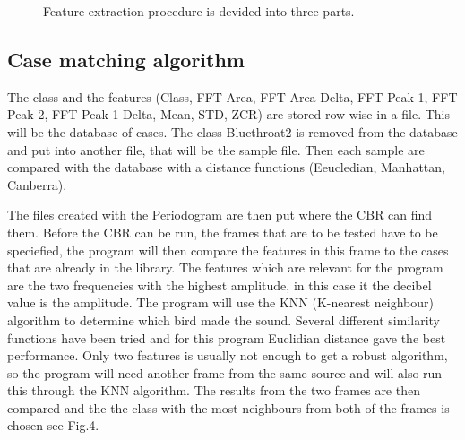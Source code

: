\begin{figure}[htp]




    \caption{Feature extraction procedure is devided into three parts.}
    \label{fig:featureExtraction}
\end{figure}



\subsection{Case matching algorithm}
The class and the features
(Class, FFT Area, FFT Area Delta, FFT Peak 1, FFT Peak 2, FFT Peak 1 Delta, Mean, STD, ZCR)
are stored row-wise in a file. This will be the database of cases.
The class Bluethroat2 is removed from the database and put into another file, that will be the sample file.
Then each sample are compared with the database with a distance functions (Eeucledian, Manhattan, Canberra).

The files created with the Periodogram are then put where the CBR can find them.
Before the CBR can be run, the frames that are to be tested have to be
speciefied, the program will then compare the features in this frame to the
cases that are already in the library. The features which are relevant for
the program are the two frequencies with the highest amplitude, in this case
it the decibel value is the amplitude. The program will use the KNN
(K-nearest neighbour) algorithm to determine which bird made the sound.
Several different similarity functions have been tried and for this program
Euclidian distance gave the best performance. Only two features is usually
not enough to get a robust algorithm, so the program will need another frame
from the same source and will also run this through the KNN algorithm. The
results from the two frames are then compared and the the class with the most
neighbours from both of the frames is chosen see Fig.4.

